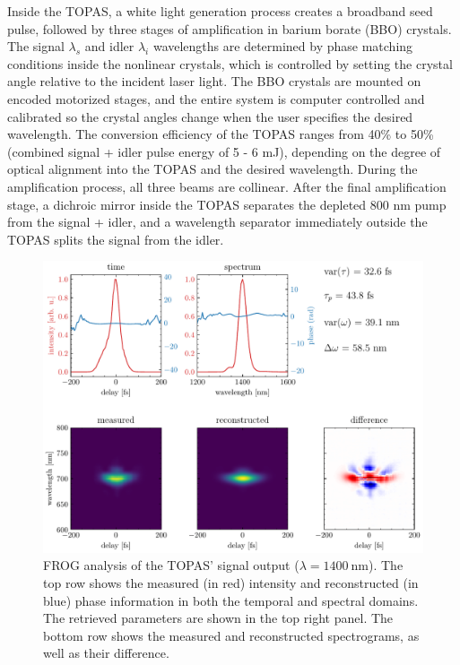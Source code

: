 Inside the TOPAS, a white light generation process creates a broadband seed pulse, followed by three stages of amplification in barium borate (BBO) crystals. The signal $\lambda_s$ and idler $\lambda_i$ wavelengths are determined by phase matching conditions inside the nonlinear crystals, which is controlled by setting the crystal angle relative to the incident laser light. The BBO crystals are mounted on encoded motorized stages, and the entire system is computer controlled and calibrated so the crystal angles change when the user specifies the desired wavelength. The conversion efficiency of the TOPAS ranges from 40\% to 50\% (combined signal + idler pulse energy of 5 - 6 mJ), depending on the degree of optical alignment into the TOPAS and the desired wavelength. During the amplification process, all three beams are collinear. After the final amplification stage, a dichroic mirror inside the TOPAS separates the depleted 800 nm pump from the signal + idler, and a wavelength separator immediately outside the TOPAS splits the signal from the idler.

\begin{figure}
	\centering
	\includegraphics[width=1.0\textwidth]{figures/chap2/TOPAS_FROG_1400nm.pdf}
	\caption{FROG analysis of the TOPAS' signal output ($\lambda = 1400 \ \textrm{nm}$). The top row shows the measured (in red) intensity and reconstructed (in blue) phase information in both the temporal and spectral domains. The retrieved parameters are shown in the top right panel. The bottom row shows the measured and reconstructed spectrograms, as well as their difference.}
	\label{fig:TOPAS_FROG_1400nm}
\end{figure}

